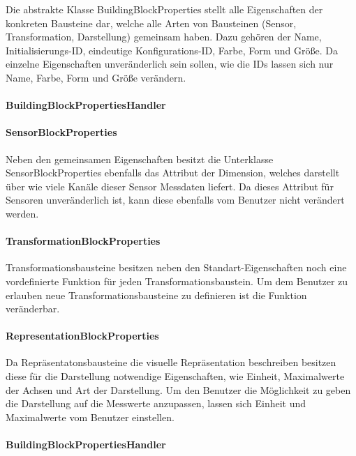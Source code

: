 \documentclass[parskip=full]{scrartcl}
\begin{document}
Die abstrakte Klasse BuildingBlockProperties stellt alle Eigenschaften der konkreten Bausteine dar, welche alle Arten von Bausteinen (Sensor, Transformation, Darstellung) gemeinsam haben. Dazu gehören der Name,  Initialisierungs-ID, eindeutige Konfigurations-ID, Farbe, Form und Größe. Da einzelne Eigenschaften unveränderlich sein sollen, wie die IDs lassen sich nur Name, Farbe, Form und Größe verändern.

\paragraph{BuildingBlockPropertiesHandler}


\paragraph{SensorBlockProperties}

Neben den gemeinsamen Eigenschaften besitzt die Unterklasse SensorBlockProperties ebenfalls das Attribut der Dimension, welches darstellt über wie viele Kanäle dieser Sensor Messdaten liefert. Da dieses Attribut für Sensoren unveränderlich ist, kann diese ebenfalls vom Benutzer nicht verändert werden.

\paragraph{TransformationBlockProperties}

Transformationsbausteine besitzen neben den Standart-Eigenschaften noch eine vordefinierte Funktion für jeden Transformationsbaustein. Um dem Benutzer zu erlauben neue Transformationsbausteine zu definieren ist die Funktion veränderbar.

\paragraph{RepresentationBlockProperties}

Da Repräsentatonsbausteine die visuelle Repräsentation beschreiben besitzen diese für die Darstellung notwendige Eigenschaften, wie Einheit, Maximalwerte der Achsen und Art der Darstellung. Um den Benutzer die Möglichkeit zu geben die Darstellung auf die Messwerte anzupassen, lassen sich Einheit und Maximalwerte vom Benutzer einstellen.

\paragraph{BuildingBlockPropertiesHandler}
\end{document}
